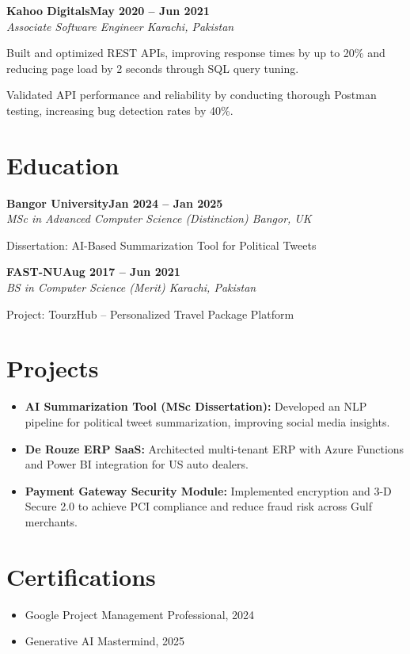 \documentclass[letterpaper,10pt]{article}
\newcommand{\headingBf}[2]{
  \hspace{10pt}\textbf{#1}\hfill\textbf{#2}\\
}
\newcommand{\headingIt}[2]{
  \hspace{10pt}\textit{#1}\hfill\textit{#2}\\
}
\newenvironment{resume_list}{
  \vspace{-7pt}
  \begin{itemize}[itemsep=-2px, parsep=1pt, leftmargin=30pt]
}{
  \end{itemize}
}
\begin{document}
\headingBf{Kahoo Digitals}{May 2020 -- Jun 2021}
\headingIt{Associate Software Engineer \hfill Karachi, Pakistan}{}
\begin{resume_list}
    \item Built and optimized REST APIs, improving response times by up to 20\% and reducing page load by 2 seconds through SQL query tuning.
    \item Validated API performance and reliability by conducting thorough Postman testing, increasing bug detection rates by 40\%.
\end{resume_list}

\section{Education}

\headingBf{Bangor University}{Jan 2024 -- Jan 2025}
\headingIt{MSc in Advanced Computer Science (Distinction) \hfill Bangor, UK}{}
\begin{resume_list}
    \item Dissertation: AI-Based Summarization Tool for Political Tweets
\end{resume_list}

\headingBf{FAST-NU}{Aug 2017 -- Jun 2021}
\headingIt{BS in Computer Science (Merit) \hfill Karachi, Pakistan}{}
\begin{resume_list}
    \item Project: TourzHub -- Personalized Travel Package Platform
\end{resume_list}

\section{Projects}
\begin{itemize}
    \setlength\itemsep{3pt}
    \item \textbf{AI Summarization Tool (MSc Dissertation):} Developed an NLP pipeline for political tweet summarization, improving social media insights.
    \item \textbf{De Rouze ERP SaaS:} Architected multi-tenant ERP with Azure Functions and Power BI integration for US auto dealers.
    \item \textbf{Payment Gateway Security Module:} Implemented encryption and 3-D Secure 2.0 to achieve PCI compliance and reduce fraud risk across Gulf merchants.
\end{itemize}

\section{Certifications}
\begin{itemize}
    \item Google Project Management Professional, 2024
    \item Generative AI Mastermind, 2025
\end{itemize}

\vspace*{\fill}
\end{document}
